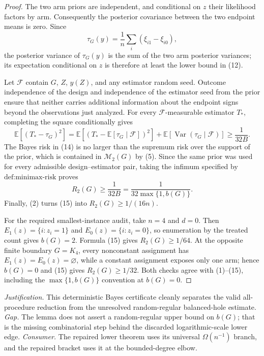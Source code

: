 \documentclass{article}
\begin{document}
\begin{proof}
The two arm priors are independent, and conditional on \(z\) their likelihood factors by arm.  Consequently the posterior covariance between the two endpoint means is zero.  Since
\[
\tau_G(y)=\frac1n\sum_i(\xi_{i1}-\xi_{i0}), \tag{13}
\]
the posterior variance of \(\tau_G(y)\) is the sum of the two arm posterior variances; its expectation conditional on \(z\) is therefore at least the lower bound in (12).

Let \(\mathcal F\) contain \(G\), \(Z\), \(y(Z)\), and any estimator random seed.  Outcome independence of the design and independence of the estimator seed from the prior ensure that neither carries additional information about the endpoint signs beyond the observations just analyzed.  For every \(\mathcal F\)-measurable estimator \(T_*\), completing the square conditionally gives
\[
\mathbb E[(T_*-\tau_G)^2]
=\mathbb E[(T_*-\mathbb E[\tau_G\mid\mathcal F])^2]
+\mathbb E[\operatorname{Var}(\tau_G\mid\mathcal F)]
\ge\frac1{32B}. \tag{14}
\]
The Bayes risk in (14) is no larger than the supremum risk over the support of the prior, which is contained in \(\mathcal M_2(G)\) by (5).  Since the same prior was used for every admissible design--estimator pair, taking the infimum specified by \(\text{def:minimax-risk}\) proves
\[
R_2(G)\ge\frac1{32B}
=\frac1{32\max\{1,b(G)\}}. \tag{15}
\]
Finally, (2) turns (15) into \(R_2(G)\ge1/(16n)\).

For the required smallest-instance audit, take \(n=4\) and \(d=0\).  Then \(E_1(z)=\{i:z_i=1\}\) and \(E_0(z)=\{i:z_i=0\}\), so enumeration by the treated count gives \(b(G)=2\).  Formula (15) gives \(R_2(G)\ge1/64\).  At the opposite finite boundary \(G=K_4\), every nonconstant assignment has \(E_1(z)=E_0(z)=\varnothing\), while a constant assignment exposes only one arm; hence \(b(G)=0\) and (15) gives \(R_2(G)\ge1/32\).  Both checks agree with (1)--(15), including the \(\max\{1,b(G)\}\) convention at \(b(G)=0\).
\end{proof}
\par\smallskip\noindent \textit{Justification.} This deterministic Bayes certificate cleanly separates the valid all-procedure reduction from the unresolved random-regular balanced-hole estimate. \textit{Gap.} The lemma does not assert a random-regular upper bound on \(b(G)\); that is the missing combinatorial step behind the discarded logarithmic-scale lower edge. \textit{Consumer.} The repaired lower theorem uses its universal \(\Omega(n^{-1})\) branch, and the repaired bracket uses it at the bounded-degree elbow.
\end{document}
